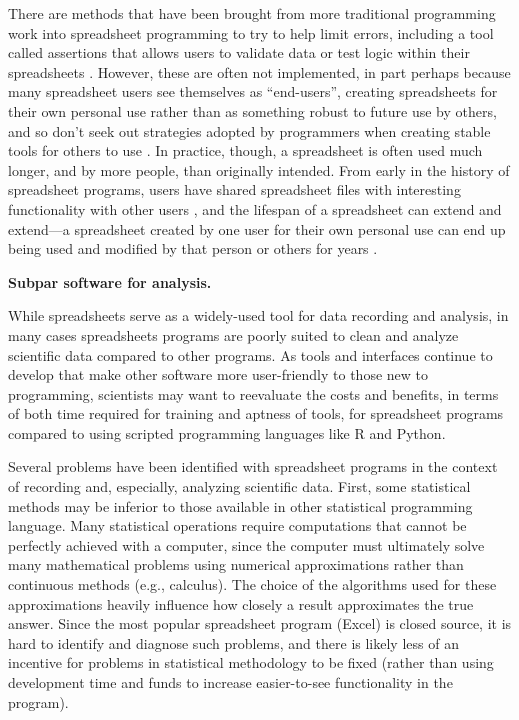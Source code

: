 \documentclass[]{tufte-book}
\begin{document}
There are methods that have been brought from more traditional programming work
into spreadsheet programming to try to help limit errors, including a tool
called assertions that allows users to validate data or test logic within their
spreadsheets \citep{hermans2016spreadsheets}. However, these are often not
implemented, in part perhaps because many spreadsheet users see themselves as
``end-users'', creating spreadsheets for their own personal use rather than as
something robust to future use by others, and so don't seek out strategies
adopted by programmers when creating stable tools for others to use
\citep{hermans2016spreadsheets}. In practice, though, a spreadsheet is often used
much longer, and by more people, than originally intended. From early in the
history of spreadsheet programs, users have shared spreadsheet files with
interesting functionality with other users \citep{levy1984spreadsheet}, and the
lifespan of a spreadsheet can extend and extend---a spreadsheet created by one
user for their own personal use can end up being used and modified by that
person or others for years \citep{hermans2016spreadsheets}.

\textbf{Subpar software for analysis.}

While spreadsheets serve as a widely-used tool for data recording and analysis,
in many cases spreadsheets programs are poorly suited to clean and analyze
scientific data compared to other programs. As tools and interfaces continue to
develop that make other software more user-friendly to those new to programming,
scientists may want to reevaluate the costs and benefits, in terms of both time
required for training and aptness of tools, for spreadsheet programs compared to
using scripted programming languages like R and Python.

Several problems have been identified with spreadsheet programs in the context
of recording and, especially, analyzing scientific data. First, some statistical
methods may be inferior to those available in other statistical programming
language. Many statistical operations require computations that cannot be
perfectly achieved with a computer, since the computer must ultimately solve
many mathematical problems using numerical approximations rather than continuous
methods (e.g., calculus). The choice of the algorithms used for these
approximations heavily influence how closely a result approximates the true
answer. Since the most popular spreadsheet program (Excel) is closed source, it
is hard to identify and diagnose such problems, and there is likely less of an
incentive for problems in statistical methodology to be fixed (rather than using
development time and funds to increase easier-to-see functionality in the
program).
\end{document}
